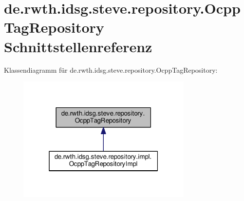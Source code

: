\hypertarget{interfacede_1_1rwth_1_1idsg_1_1steve_1_1repository_1_1_ocpp_tag_repository}{\section{de.\+rwth.\+idsg.\+steve.\+repository.\+Ocpp\+Tag\+Repository Schnittstellenreferenz}
\label{interfacede_1_1rwth_1_1idsg_1_1steve_1_1repository_1_1_ocpp_tag_repository}
}


Klassendiagramm für de.\+rwth.\+idsg.\+steve.\+repository.\+Ocpp\+Tag\+Repository\+:\nopagebreak
\begin{figure}[H]
\begin{center}
\leavevmode
\includegraphics[width=247pt]{interfacede_1_1rwth_1_1idsg_1_1steve_1_1repository_1_1_ocpp_tag_repository__inherit__graph}
\end{center}
\end{figure}

